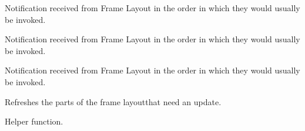 \label{cbsimpleupdatesmgronpanewillchange}


Notification received from Frame Layout in the order in which
they would usually be invoked.


\label{cbsimpleupdatesmgronrowwillchange}


Notification received from Frame Layout in the order in which
they would usually be invoked.


\label{cbsimpleupdatesmgronstartchanges}


Notification received from Frame Layout in the order in which
they would usually be invoked.


\label{cbsimpleupdatesmgrupdatenow}


Refreshes the parts of the frame layoutthat need an update.


\label{cbsimpleupdatesmgrwaschanged}


Helper function.

